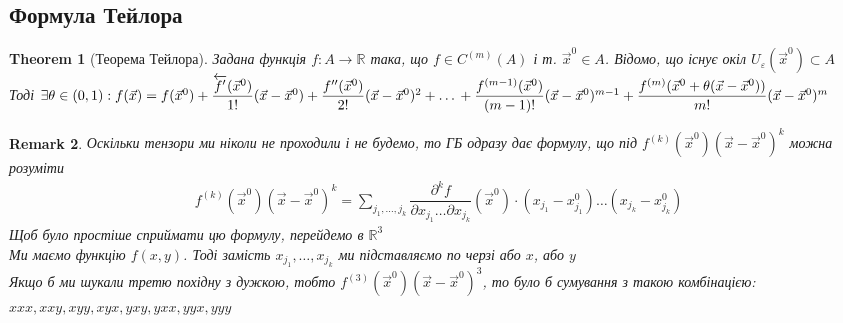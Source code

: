 \documentclass[a4paper, 14pt]{extarticle}
\theoremstyle{theoremdd}
\newtheorem{theorem}{Theorem}[subsection]
\theoremstyle{theoremdd}
\theoremstyle{theoremdd}
\theoremstyle{theoremdd}
\theoremstyle{theoremdd}
\theoremstyle{theoremdd}
\newtheorem{remark}[theorem]{Remark}
\theoremstyle{theoremdd}
\theoremstyle{theoremdd}
\begin{document}
\subsection{Формула Тейлора}
\begin{theorem}[Теорема Тейлора]
Задана функція $f: A \to \mathbb{R}$ така, що $f \in C^{(m)}(A)$ і т. $\vec{x}^0 \in A$. Відомо, що існує окіл $U_{\varepsilon}(\vec{x}^0) \subset A$\\
Тоді $\exists \theta \in (0,1): f(\vec{x}) = f(\vec{x}^0) + \dfrac{\overleftarrow{f'}(\vec{x}^0)}{1!}(\vec{x}-\vec{x}^0) + \dfrac{f''(\vec{x}^0)}{2!}(\vec{x}-\vec{x}^0)^2 + \dots \\ + \dfrac{f^{(m-1)}(\vec{x}^0)}{(m-1)!}(\vec{x}-\vec{x}^0)^{m-1} + \dfrac{f^{(m)}(\vec{x}^0+\theta(\vec{x}-\vec{x}^0))}{m!}(\vec{x}-\vec{x}^0)^m$
\end{theorem}
\begin{remark}
Оскільки тензори ми ніколи не проходили і не будемо, то ГБ одразу дає формулу, що під $f^{(k)}(\vec{x}^0)(\vec{x}-\vec{x}^0)^k$ можна розуміти
\begin{align*}
f^{(k)}(\vec{x}^0)(\vec{x}-\vec{x}^0)^k = \sum_{j_1,\dots,j_k} \dfrac{\partial^k f}{\partial x_{j_1}\dots \partial x_{j_k}}(\vec{x}^0) \cdot (x_{j_1}-x_{j_1}^0) \dots (x_{j_k}-x_{j_k}^0)
\end{align*}
Щоб було простіше сприймати цю формулу, перейдемо в $\mathbb{R}^3$\\
Ми маємо функцію $f(x,y)$. Тоді замість $x_{j_1},\dots,x_{j_k}$ ми підставляємо по черзі або $x$, або $y$\\
Якщо б ми шукали третю похідну з дужкою, тобто $f^{(3)}(\vec{x}^0)(\vec{x}-\vec{x}^0)^3$, то було б сумування з такою комбінацією: $xxx, xxy, xyy, xyx, yxy, yxx, yyx, yyy$
\end{remark}
\end{document}
